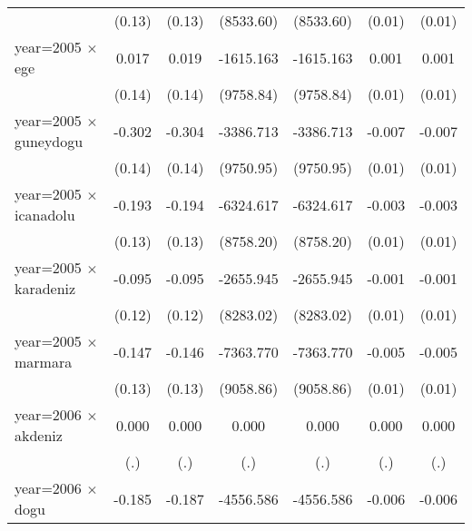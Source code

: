 {\begin{tabular}{l*{6}{c}}
                    &      (0.13)         &      (0.13)         &   (8533.60)         &   (8533.60)         &      (0.01)         &      (0.01)         \\
year=2005 $\times$ ege&       0.017         &       0.019         &   -1615.163         &   -1615.163         &       0.001         &       0.001         \\
                    &      (0.14)         &      (0.14)         &   (9758.84)         &   (9758.84)         &      (0.01)         &      (0.01)         \\
year=2005 $\times$ guneydogu&      -0.302\sym{*}  &      -0.304\sym{*}  &   -3386.713         &   -3386.713         &      -0.007         &      -0.007         \\
                    &      (0.14)         &      (0.14)         &   (9750.95)         &   (9750.95)         &      (0.01)         &      (0.01)         \\
year=2005 $\times$ icanadolu&      -0.193         &      -0.194         &   -6324.617         &   -6324.617         &      -0.003         &      -0.003         \\
                    &      (0.13)         &      (0.13)         &   (8758.20)         &   (8758.20)         &      (0.01)         &      (0.01)         \\
year=2005 $\times$ karadeniz&      -0.095         &      -0.095         &   -2655.945         &   -2655.945         &      -0.001         &      -0.001         \\
                    &      (0.12)         &      (0.12)         &   (8283.02)         &   (8283.02)         &      (0.01)         &      (0.01)         \\
year=2005 $\times$ marmara&      -0.147         &      -0.146         &   -7363.770         &   -7363.770         &      -0.005         &      -0.005         \\
                    &      (0.13)         &      (0.13)         &   (9058.86)         &   (9058.86)         &      (0.01)         &      (0.01)         \\
year=2006 $\times$ akdeniz&       0.000         &       0.000         &       0.000         &       0.000         &       0.000         &       0.000         \\
                    &         (.)         &         (.)         &         (.)         &         (.)         &         (.)         &         (.)         \\
year=2006 $\times$ dogu&      -0.185         &      -0.187         &   -4556.586         &   -4556.586         &      -0.006         &      -0.006         \\

\end{tabular}}
